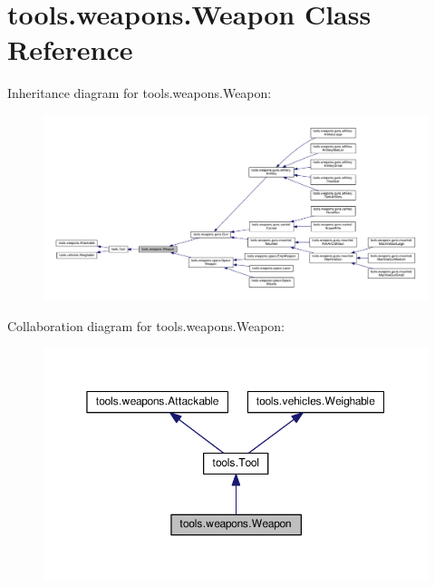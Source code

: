 \hypertarget{classtools_1_1weapons_1_1_weapon}{}\section{tools.\+weapons.\+Weapon Class Reference}
\label{classtools_1_1weapons_1_1_weapon}


Inheritance diagram for tools.\+weapons.\+Weapon\+:
\nopagebreak
\begin{figure}[H]
\begin{center}
\leavevmode
\includegraphics[width=350pt]{classtools_1_1weapons_1_1_weapon__inherit__graph}
\end{center}
\end{figure}


Collaboration diagram for tools.\+weapons.\+Weapon\+:
\nopagebreak
\begin{figure}[H]
\begin{center}
\leavevmode
\includegraphics[width=350pt]{classtools_1_1weapons_1_1_weapon__coll__graph}
\end{center}
\end{figure}
